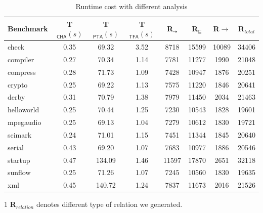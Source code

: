 \documentclass{fac}
\newcommand{\less}{\sqsubseteq}
\newcommand{\tflow}{\dashrightarrow}
\begin{document}

\begin{table} %
\centering
\begin{threeparttable}[b]
\begin{tabular}{lccccccc}
	\hline
	\textbf{Benchmark} & \hspace{-2pt}\textbf{T$_{\textsf{CHA}}(s)$}& \hspace{-2pt}\textbf{T$_{\textsf{PTA}}(s)$} & \hspace{-2pt}\textbf{T$_{\textsf{TFA}}(s)$} & \hspace{2pt}\textbf{R$_{\tflow}$}\hspace{2pt} & \hspace{2pt}\textbf{R$_{\less}$}\hspace{2pt} & \hspace{2pt}\textbf{R${\rightarrow}$}\hspace{2pt} &\textbf{R$_{total}$}\\
	\hline
check & 0.35 & 69.32 & 3.52 & 8718 & 15599 & 10089 & 34406\\
compiler & 0.27 & 70.34 & 1.14 & 7781 & 11277 & 1990 & 21048\\
compress & 0.28 & 71.73 & 1.09 & 7428 & 10947 & 1876 & 20251\\
crypto & 0.25 & 69.22 & 1.13 & 7575 & 11220 & 1846 & 20641\\
derby & 0.31 & 70.79 & 1.38 & 7979 & 11450 & 2034 & 21463\\
helloworld & 0.25 & 70.44 & 1.25 & 7230 & 10543 & 1828 & 19601\\
mpegaudio & 0.25 & 69.13 & 1.04 & 7279 & 10612 & 1830 & 19721\\
scimark & 0.24 & 71.01 & 1.15 & 7451 & 11344 & 1845 & 20640\\
serial & 0.43 & 69.20 & 1.07 & 7683 & 10977 & 1886 & 20546\\
startup & 0.47 & 134.09 & 1.46 & 11597 & 17870 & 2651 & 32118\\
sunflow & 0.25 & 71.26 & 1.07 & 7245 & 10560 & 1830 & 19635\\
xml & 0.45 & 140.72 & 1.24 & 7837 & 11673 & 2016 & 21526\\
	\hline
\end{tabular}
\begin{tablenotes}
  \item[1] \textbf{R}$_{relation}$ denotes different type of relation we generated.
\end{tablenotes}
\caption{Runtime cost with different analysis}
\label{table:TimeCost}
\end{threeparttable}
\end{table}
\end{document}
